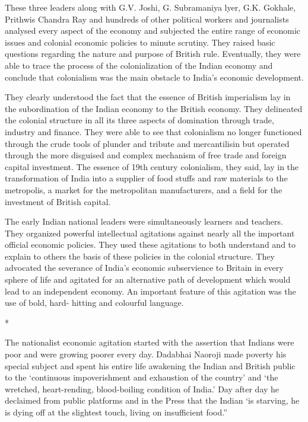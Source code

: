 These three leaders along with G.V. Joshi, G. Subramaniya lyer, G.K. Gokhale, Prithwis Chandra Ray and hundreds of other political workers and journalists analysed every aspect of the economy and subjected the entire range of economic issues and colonial economic policies to minute scrutiny. They raised basic questions regarding the nature and purpose of British rule. Eventually, they were able to trace the process of the colonialization of the Indian economy and conclude that colonialism was the main obstacle to India’s economic development.

They clearly understood the fact that the essence of British imperialism lay in the subordination of the Indian economy to the British economy. They delineated the colonial structure in all its three aspects of domination through trade, industry and finance. They were able to see that colonialism no longer functioned through the crude tools of plunder and tribute and mercantilisin but operated through the more disguised and complex mechanism of free trade and foreign capital investment. The essence of 19th century colonialism, they said, lay in the transformation of India into a supplier of food stuffs and raw materials to the metropolis, a market for the metropolitan manufacturers, and a field for the investment of British capital.

The early Indian national leaders were simultaneously learners and teachers. They organized powerful intellectual agitations against nearly all the important official economic policies. They used these agitations to both understand and to explain to others the basis of these policies in the colonial structure. They advocated the severance of India’s economic subservience to Britain in every sphere of life and agitated for an alternative path of development which would lead to an independent economy. An important feature of this agitation was the use of bold, hard- hitting and colourful language.

\begin{center}*\end{center}



The nationalist economic agitation started with the assertion that Indians were poor and were growing poorer every day. Dadabhai Naoroji made poverty his special subject and spent his entire life awakening the Indian and British public to the ‘continuous impoverishment and exhaustion of the country’ and ‘the wretched, heart-rending, blood-boiling condition of India.’ Day after day he declaimed from public platforms and in the Press that the Indian ‘is starving, he is dying off at the slightest touch, living on insufficient food.”

